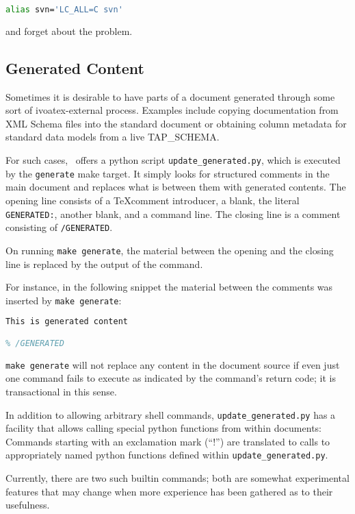 \documentclass[11pt,a4paper]{ivoa}
\begin{document}
\begin{lstlisting}[language=sh]
alias svn='LC_ALL=C svn'
\end{lstlisting}

and forget about the problem.


\subsection{Generated Content}
\label{sect:generated}

Sometimes it is desirable to have parts of a document generated through
some sort of ivoatex-external process.  Examples include copying
documentation from XML Schema files into the standard document 
or obtaining column metadata for standard
data models from a live TAP\_SCHEMA.

For such cases, \ivoatex\ offers a python script
\texttt{update\_generated.py}, which is executed by the
\texttt{generate} make target.  It simply looks for structured comments
in the main document and replaces what is between them with generated
contents.  The opening line consists of a \TeX comment introducer, a
blank, the literal \texttt{GENERATED:}, another blank, and a command
line.  The closing line is a comment consisting of \texttt{/GENERATED}.

On running \texttt{make generate}, the material between the opening and
the closing line is replaced by the output of the command.

For instance, in the following snippet the material between the comments
was inserted by \texttt{make generate}:

\begin{lstlisting}[language=TeX]
% GENERATED: echo This is generated content
This is generated content

% /GENERATED
\end{lstlisting}

\texttt{make generate} will not replace any content in the document source
if even just one command fails to execute as indicated by the
command's return code; it is transactional in this sense.

In addition to allowing arbitrary shell
commands, \texttt{update\_generated.py} has a facility that allows
calling special python functions from within documents: Commands
starting with an exclamation mark (``!'') are translated to calls to
appropriately named python functions defined within
\texttt{update\_generated.py}.

Currently, there are two such builtin commands; both are somewhat
experimental features that may change when more experience has been
gathered as to their usefulness.
\end{document}
